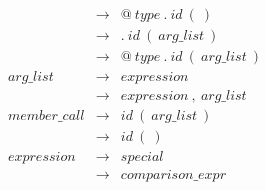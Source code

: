 \documentclass{article}
\begin{document}
\begin{eqnarray*}
	                 & \rightarrow & @ \ type \ . \ id \ ( \ )\\ 
	                 & \rightarrow & . \ id \ ( \ arg\_list \ ) \\
	                 & \rightarrow & @ \ type \ . \ id \ ( \ arg\_list \ ) \\
    arg\_list        & \rightarrow & expression \\
                     & \rightarrow & expression \ , \ arg\_list	\\
    member\_call     & \rightarrow & id \ ( \ arg\_list \ ) \\
                     & \rightarrow & id \ ( \ ) \\	
    expression       & \rightarrow & special\\
                     & \rightarrow & comparison\_expr\\
\end{eqnarray*}
\end{document}
